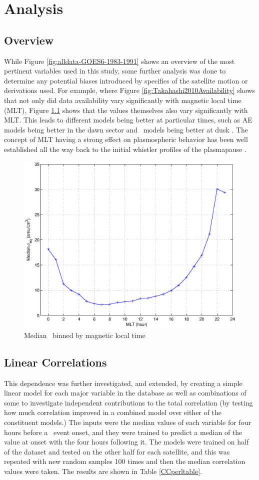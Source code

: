 \chapter[Analysis]{Analysis}

\section{Overview}
While Figure \ref{fig:alldata-GOES6-1983-1991} shows an overview of the most pertinent variables used in this study, some further analysis was done to determine any potential biases introduced by specifics of the satellite motion or derivations used. For example, where Figure \ref{fig:Takahashi2010Availability} shows that not only did data availability vary significantly with magnetic local time (MLT), Figure \ref{fig:ByHourExample} shows that the values themselves also vary significantly with MLT.  This leads to different models being better at particular times, such as AE models being better in the dawn sector and \dst\ models being better at dusk \citep{OBrien2003EmpiricalPlasmapause}. The concept of MLT having a strong effect on plasmospheric behavior has been well established all the way back to the initial whistler profiles of the plasmapause \citep{Carpenter1966WhistlerStudiesPlasmapause}.

\begin{figure}[htp!]
\centering
\includegraphics[width=0.7\linewidth]{Figures/rhoMLT.eps}
\caption{Median \req\ binned by magnetic local time}
\label{fig:ByHourExample}
\end{figure}


\section{Linear Correlations}
This dependence was further investigated, and extended, by creating a simple linear model for each major variable in the database as well as combinations of some to investigate independent contributions to the total correlation (by testing how much correlation improved in a combined model over either of the constituent models.)  The inputs were the median values of each variable for four hours before a \dst\ event onset, and they were trained to predict a median of the value at onset with the four hours following it. The models were trained on half of the dataset and tested on the other half for each satellite, and this was repeated with new random samples 100 times and then the median correlation values were taken. The results are shown in Table \ref{CCperltable}.


